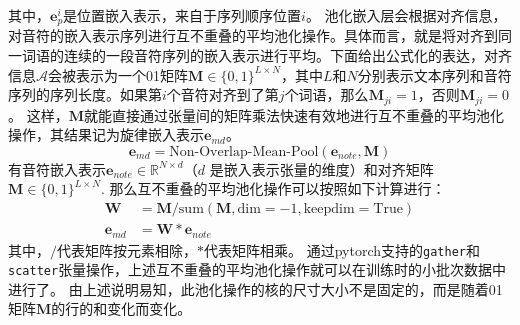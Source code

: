 其中，$\mathbf{e}_p^i$是位置嵌入表示，来自于序列顺序位置$i$。
池化嵌入层会根据对齐信息，对音符的嵌入表示序列进行互不重叠的平均池化操作。具体而言，就是将对齐到同一词语的连续的一段音符序列的嵌入表示进行平均。下面给出公式化的表达，对齐信息$\mathcal{A}$会被表示为一个01矩阵$\mathbf{M} \in \{0,1\}^{L \times N}$，其中$L$和$N$分别表示文本序列和音符序列的序列长度。如果第$i$个音符对齐到了第$j$个词语，那么$\mathbf{M}_{ji}=1$，否则$\mathbf{M}_{ji}=0$。
这样，$\mathbf{M}$就能直接通过张量间的矩阵乘法快速有效地进行互不重叠的平均池化操作，其结果记为旋律嵌入表示$\mathbf{e}_{md}$。
\begin{equation}
\label{eq:md_embed}
    \mathbf{e}_{md} = \text{Non-Overlap-Mean-Pool}(\mathbf{e}_{note}, \mathbf{M})
\end{equation}
有音符嵌入表示$\mathbf{e}_{note} \in \mathbb{R}^{N \times d}$（$d$ 是嵌入表示张量的维度）和对齐矩阵$\mathbf{M} \in \{0, 1\}^{L \times N}$.
那么互不重叠的平均池化操作可以按照如下计算进行：
\begin{align*}
\mathbf{W} &= \mathbf{M} / \text{sum}(\mathbf{M}, \text{dim}=-1, \text{keepdim}=\text{True}) \\
\mathbf{e}_{md} &= \mathbf{W} * \mathbf{e}_{note}
\end{align*}
其中，$/$代表矩阵按元素相除，$*$代表矩阵相乘。
通过pytorch支持的\texttt{gather}和\texttt{scatter}张量操作，上述互不重叠的平均池化操作就可以在训练时的小批次数据中进行了。
由上述说明易知，此池化操作的核的尺寸大小不是固定的，而是随着01矩阵$\mathbf{M}$的行的和变化而变化。

